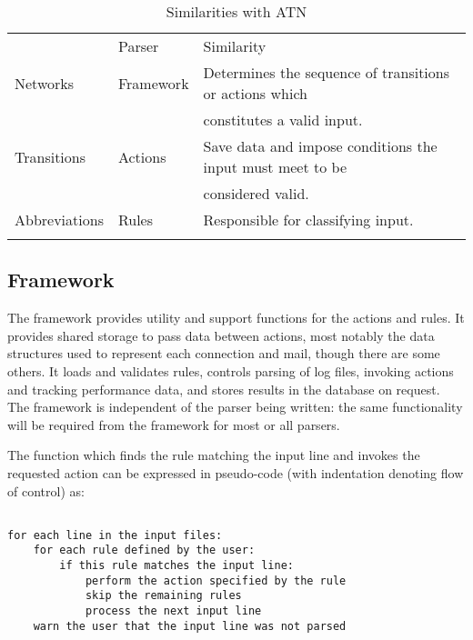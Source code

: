 \documentclass[draft]{svmult}
\begin{document}

\begin{table}[ht]
    \caption{Similarities with ATN}\label{Similarities with ATN}
    \begin{tabular}[]{lll}
        \hline
        \noalign{\smallskip}
        \ATN{}        & Parser    & Similarity                          \\
        \noalign{\smallskip}
        \hline
        \noalign{\smallskip}
        Networks      & Framework & Determines the sequence of
                                    transitions or actions which        \\
                      &           & constitutes a valid input.          \\
        Transitions   & Actions   & Save data and impose conditions the
                                    input must meet to be               \\
                      &           & considered valid.                   \\
        Abbreviations & Rules     & Responsible for classifying input.  \\
        \noalign{\smallskip}
        \hline
        \noalign{\smallskip}
    \end{tabular}
\end{table}

\subsection{Framework}

\label{Framework}

The framework provides utility and support functions for the actions and
rules.  It provides shared storage to pass data between actions, most
notably the data structures used to represent each connection and mail,
though there are some others.  It loads and validates rules, controls
parsing of log files, invoking actions and tracking performance data, and
stores results in the database on request.  The framework is independent of
the parser being written: the same functionality will be required from the
framework for most or all parsers.

The function which finds the rule matching the input line and invokes the
requested action can be expressed in pseudo-code (with indentation denoting
flow of control) as:

\begin{verbatim}

for each line in the input files:
    for each rule defined by the user:
        if this rule matches the input line:
            perform the action specified by the rule
            skip the remaining rules
            process the next input line
    warn the user that the input line was not parsed

\end{verbatim}
\end{document}
